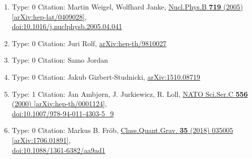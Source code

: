 \documentclass[a4paper,10pt]{article}
\begin{document}
\begin{enumerate}
\begin{enumerate}
  \item Type: 0 Citation: Martin Weigel, Wolfhard Janke, \href{https://www.doi.org/10.1016/j.nuclphysb.2005.04.041}{Nucl.Phys.B {\bf 719} (2005) }  \href{https://arxiv.org/abs/hep-lat/0409028}{[arXiv:hep-lat/0409028]},\\\href{https://www.doi.org/10.1016/j.nuclphysb.2005.04.041}{doi:10.1016/j.nuclphysb.2005.04.041}
  \item Type: 0 Citation: Juri Rolf, \href{https://arxiv.org/abs/hep-th/9810027}{arXiv:hep-th/9810027}
  \item Type: 0 Citation: Samo Jordan
  \item Type: 0 Citation: Jakub Gizbert-Studnicki, \href{https://arxiv.org/abs/1510.08719}{arXiv:1510.08719}
  \item Type: 1 Citation: Jan Ambjørn, J. Jurkiewicz, R. Loll, \href{https://www.doi.org/10.1007/978-94-011-4303-5_9}{NATO Sci.Ser.C {\bf 556} (2000) }  \href{https://arxiv.org/abs/hep-th/0001124}{[arXiv:hep-th/0001124]},\\\href{https://www.doi.org/10.1007/978-94-011-4303-5_9}{doi:10.1007/978-94-011-4303-5\_9}
  \item Type: 0 Citation: Markus B. Fröb, \href{https://www.doi.org/10.1088/1361-6382/aa9ad1}{Class.Quant.Grav. {\bf 35} (2018) 035005}  \href{https://arxiv.org/abs/1706.01891}{[arXiv:1706.01891]},\\\href{https://www.doi.org/10.1088/1361-6382/aa9ad1}{doi:10.1088/1361-6382/aa9ad1}

\end{enumerate}
\end{enumerate}
\end{document}
